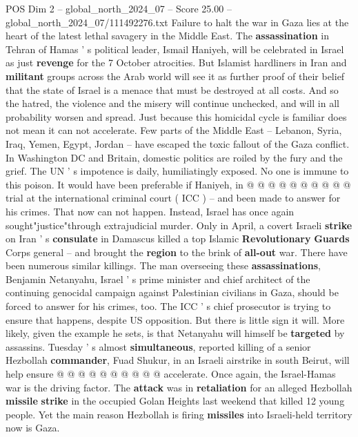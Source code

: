 \begin{textsample}{POS Dim 2 – global\_north\_2024\_07 – Score 25.00 – global\_north\_2024\_07/111492276.txt}  \label{ex:f2_pos_186}
Failure to halt the war in Gaza lies at the heart of the latest lethal savagery in the Middle East.
The \textbf{assassination} in Tehran of Hamas ' s political leader, Ismail Haniyeh, will be celebrated in Israel as just \textbf{revenge} for the 7 October atrocities.
But Islamist hardliners in Iran and \textbf{militant} groups across the Arab world will see it as further proof of their belief that the state of Israel is a menace that must be destroyed at all costs.
And so the hatred, the violence and the misery will continue unchecked, and will in all probability worsen and spread.
Just because this homicidal cycle is familiar does not mean it can not accelerate.
Few parts of the Middle East -- Lebanon, Syria, Iraq, Yemen, Egypt, Jordan -- have escaped the toxic fallout of the Gaza conflict.
In Washington DC and Britain, domestic politics are roiled by the fury and the grief.
The UN ' s impotence is daily, humiliatingly exposed.
No one is immune to this poison.
It would have been preferable if Haniyeh, in @ @ @ @ @ @ @ @ @ @ trial at the international criminal court ( ICC ) -- and been made to answer for his crimes.
That now can not happen.
Instead, Israel has once again sought"justice"through extrajudicial murder.
Only in April, a covert Israeli \textbf{strike} on Iran ' s \textbf{consulate} in Damascus killed a top Islamic \textbf{Revolutionary} \textbf{Guards} Corps general -- and brought the \textbf{region} to the brink of \textbf{all-out} war.
There have been numerous similar killings.
The man overseeing these \textbf{assassinations}, Benjamin Netanyahu, Israel ' s prime minister and chief architect of the continuing genocidal campaign against Palestinian civilians in Gaza, should be forced to answer for his crimes, too.
The ICC ' s chief prosecutor is trying to ensure that happens, despite US opposition.
But there is little sign it will.
More likely, given the example he sets, is that Netanyahu will himself be \textbf{targeted} by assassins.
Tuesday ' s almost \textbf{simultaneous}, reported killing of a senior Hezbollah \textbf{commander}, Fuad Shukur, in an Israeli airstrike in south Beirut, will help ensure @ @ @ @ @ @ @ @ @ @ accelerate.
Once again, the Israel-Hamas war is the driving factor.
The \textbf{attack} was in \textbf{retaliation} for an alleged Hezbollah \textbf{missile} \textbf{strike} in the occupied Golan Heights last weekend that killed 12 young people.
Yet the main reason Hezbollah is firing \textbf{missiles} into Israeli-held territory now is Gaza.

\end{textsample}
